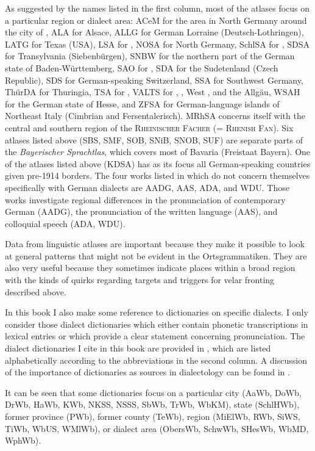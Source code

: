 As suggested by the names listed in the first column, most of the atlases focus on a particular region or dialect area: ACeM for the area in North Germany around the city of , ALA for Alsace, ALLG for German Lorraine (Deutsch-Lothringen), LATG for Texas (USA), LSA for , NOSA for North Germany,  SchlSA for , SDSA for Transylvania (Siebenbürgen), SNBW for the northern part of the German state of Baden-Württemberg, SAO for , SDA for the Sudetenland (Czech Republic), SDS for German-speaking Switzerland, SSA for Southwest Germany, ThürDA for Thuringia, TSA for , VALTS for , , West , and the Allgäu, WSAH for the German state of Hesse, and ZFSA for German-language islands of Northeast Italy (Cimbrian and Fersentalerisch). MRhSA concerns itself with the central and southern region of the \textsc{Rheinischer} \textsc{Fächer} (= \textsc{Rhenish Fan}). Six atlases listed above (SBS, SMF, SOB, SNiB, SNOB, SUF) are separate parts of the \textit{Bayerischer Sprachtlas}, which covers most of Bavaria (Freistaat Bayern). One of the atlases listed above (KDSA) has as its focus all German-speaking countries given pre-1914 borders. The four works listed in  which do not concern themselves specifically with German dialects are AADG, AAS, ADA, and WDU. Those works investigate regional differences in the pronunciation of contemporary German (AADG), the pronunciation of the written language (AAS), and colloquial speech (ADA, WDU).

Data from linguistic atlases are important because they make it possible to look at general patterns that might not be evident in the Ortsgrammatiken. They are also very useful because they sometimes indicate places within a broad region with the kinds of quirks regarding targets and triggers for velar fronting described above.

In this book I also make some reference to dictionaries on specific dialects. I only consider those dialect dictionaries which either contain phonetic transcriptions in lexical entries or which provide a clear statement concerning pronunciation. The dialect dictionaries I cite in this book are provided in , which are listed alphabetically according to the abbreviations in the second column. A discussion of the importance of dictionaries as sources in dialectology can be found in \citet[40--42]{NiebaumMacha2014}.

It can be seen that some dictionaries focus on a particular city (AaWb, DoWb, DrWb, HaWb, KWb, NKSS, NSSS, SbWb, TrWb, WbKM), state (SchlHWb), former province (PWb), former county (TeWb), region (MiElWb, RWb, SiWS, TiWb, WbUS, WMlWb), or dialect area (ObersWb, SchwWb, SHesWb, WbMD, WphWb).


